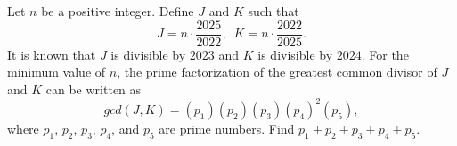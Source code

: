 Let $n$ be a positive integer. Define $J$ and $K$ such that \[J = n \cdot \dfrac{2025}{2022}, \,\,\, K = n \cdot \dfrac{2022}{2025}.\]It is known that $J$ is divisible by $2023$ and $K$ is divisible by $2024$. For the minimum value of $n$, the prime factorization of the greatest common divisor of $J$ and $K$ can be written as \[gcd(J,K) = (p_1)(p_2)(p_3)(p_4)^2(p_5),\]where $p_1$, $p_2$, $p_3$, $p_4$, and $p_5$ are prime numbers. Find $p_1 + p_2 + p_3 + p_4 + p_5.$

